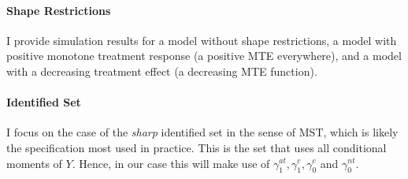 \documentclass[12pt,a4paper,english]{article} %
\numberwithin{equation}{section}
\theoremstyle{definition}
\theoremstyle{remark}
\theoremstyle{plain}
\begin{document}
\paragraph{Shape Restrictions}
I provide simulation results for a model without shape restrictions, a model with positive monotone treatment response (a positive MTE everywhere), and a model with a decreasing treatment effect (a decreasing MTE function).

\paragraph{Identified Set}
I focus on the case of the \textit{sharp} identified set in the sense of MST, which is likely the specification most used in practice.
This is the set that uses all conditional moments of $Y$.
Hence, in our case this will make use of $\gamma_1^{at}, \gamma_1^{c}, \gamma_0^{c}$ and $\gamma_0^{nt}$.


\end{document}
